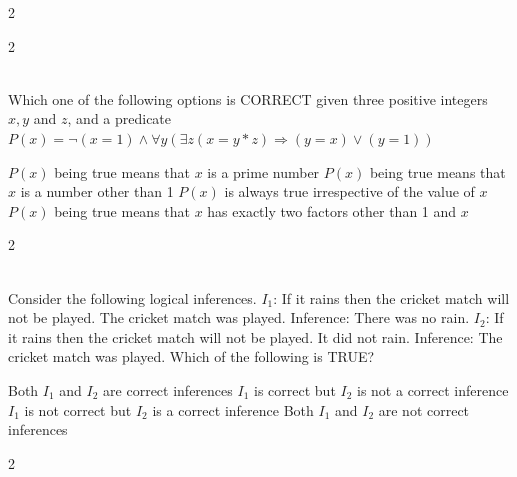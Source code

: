 \documentclass[12pt]{exam}
\begin{document}
\begin{questions}
\begin{multicols*}{2}
\end{multicols*}
\vspace{0.6cm}
\newpage
\begin{multicols*}{2}

 \\[0.2cm]
{\Large Which one of the following options is CORRECT given three positive integers $x, y$ and $z$, and a predicate\newline
$P(x) = \neg (x = 1) \wedge \forall y (\exists z (x = y * z) \Rightarrow (y = x) \vee (y = 1))$}
\begin{choices}
  \choice $P(x)$ being true means that $x$ is a prime number
  \choice $P(x)$ being true means that $x$ is a number other than 1
  \choice $P(x)$ is always true irrespective of the value of $x$
  \choice $P(x)$ being true means that $x$ has exactly two factors other than 1 and $x$
\end{choices}

\end{multicols*}
\vspace{0.6cm}
\newpage
\begin{multicols*}{2}

 \\[0.2cm]
{\Large Consider the following logical inferences.\newline
$I_1$: If it rains then the cricket match will not be played.\newline
The cricket match was played.\newline
Inference: There was no rain.\newline
$I_2$: If it rains then the cricket match will not be played.\newline
It did not rain.\newline
Inference: The cricket match was played.\newline
Which of the following is TRUE?}
\begin{choices}
  \choice Both $I_1$ and $I_2$ are correct inferences
  \choice $I_1$ is correct but $I_2$ is not a correct inference
  \choice $I_1$ is not correct but $I_2$ is a correct inference
  \choice Both $I_1$ and $I_2$ are not correct inferences
\end{choices}

\end{multicols*}
\vspace{0.6cm}
\newpage
\begin{multicols*}{2}


\end{multicols*}
\end{questions}
\end{document}
